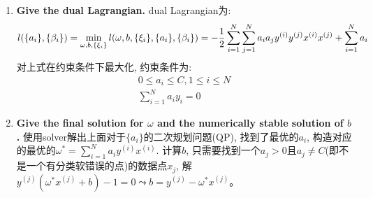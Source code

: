 \documentclass[paper=a4, fontsize=11pt]{scrartcl} %
\numberwithin{equation}{section} %
\numberwithin{figure}{section} %
\numberwithin{table}{section} %
\begin{document}
\begin{enumerate}[a]
\item \textbf{Give the dual Lagrangian.}
  dual Lagrangian为:
  \[
  l(\{a_i\}, \{\beta_i\}) = \min_{\omega, b, \{\xi_i\}} l(\omega, b, \{\xi_i\}, \{a_i\}, \{\beta_i\}) = -\frac{1}{2} \sum_{i=1}^N\sum_{j=1}^N a_i a_j y^{(i)} y^{(j)} x^{(i)} x^{(j)} + \sum_{i=1}^N a_i\\
  \]
  对上式在约束条件下最大化, 约束条件为:
  \[
  \begin{split}
    0 \leq a_i \leq C, 1 \leq i \leq N\\
    \sum_{i=1}^{N} a_i y_i = 0
  \end{split}
  \]
\item \textbf{Give the final solution for $\omega$ and the numerically stable solution of $b$.}
  使用solver解出上面对于$\{a_i\}$的二次规划问题(QP), 找到了最优的$a_i$, 构造对应的最优的$\omega^{*} = \sum_{i=1}^N a_i y^{(i)} x^{(i)}$.
  计算$b$, 只需要找到一个$a_j > 0$且$a_j \neq C$(即不是一个有分类软错误的点)的数据点$x_j$, 解$y^{(j)}(\omega^{*} x^{(j)} + b) - 1 = 0 \leadsto b = y^{(j)} - \omega^{*}x^{(j)}$。
\end{enumerate}
\end{document}
